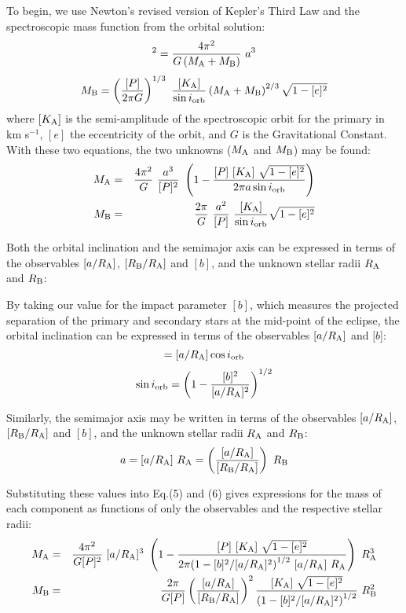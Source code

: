 \documentclass[12pt, preprint]{aastex}
\begin{document}
To begin, we use Newton's revised version of Kepler's Third Law and
the spectroscopic mass function from the orbital solution:
\begin{equation}
[P]^2 = \frac{4 \pi^{2}}{G\left(M_{\rm A} + M_{\rm B}\right)} \ a^{3}
\end{equation}
\begin{equation}
M_{\rm B} = \left(\frac{[P]}{2 \pi G}\right)^{1/3} \ \frac{[K_{\rm A}]}{\sin i_{\rm orb}} 
\left(M_{\rm A} + M_{\rm B}\right)^{2/3} \sqrt{1-[e]^2}
\end{equation}
where $[K_{\rm A}]$ is the semi-amplitude of the spectroscopic
orbit for the primary in km s$^{-1}$, $[e]$ the eccentricity of the
orbit, and $G$ is the Gravitational Constant. With these two equations,
the two unknowns ($M_{\rm A}$ and $M_{\rm B}$) may be found:
\begin{eqnarray}
M_{\rm A} & = & \frac{4 \pi^2}{G} \ \frac{a^3}{[P]^2} \ \left(1 - \frac{[P] \ [K_{\rm A}] \ \sqrt{1-[e]^2} }{ 2 \pi a \sin i_{\rm orb}} \right) \\
M_{\rm B} & = & \frac{2 \pi}{G} \ \frac{a^2}{[P]} \ \frac{[K_{\rm A}]}{\sin i_{\rm orb}} \sqrt{1-[e]^2}
\end{eqnarray}

Both the orbital inclination and the semimajor axis can be expressed in
terms of the observables $[a/R_{\rm A}]$, $[R_{\rm B}/R_{\rm
A}]$ and $[b]$, and the unknown stellar radii $R_{\rm A}$ and $R_{\rm B}$:

By taking our value for the impact parameter $[b]$, which measures the projected separation of the primary and secondary stars at the mid-point of the eclipse, the orbital inclination can be expressed in terms of the observables $[a/R_{\rm A}]$ and $[b$]:
\begin{equation}
[b] = [a/R_{\rm A}] \cos i_{\rm orb}
\end{equation}
\begin{equation}
\sin i_{\rm orb} = \left(1 - \frac{[b]^2}{[a/R_{\rm A}]^2}\right)^{1/2}
\end{equation}

Similarly, the semimajor axis may be written in terms of the observables $[a/R_{\rm A}]$, $[R_{\rm B}/R_{\rm A}]$ and $[b]$, and the unknown stellar radii $R_{\rm A}$ and $R_{\rm B}$:
\begin{equation}
a = [a/R_{\rm A}] \ R_{\rm A} = \left(\frac{[a/R_{\rm A}]}{[R_{\rm B}/R_{\rm A}]} \right) \ R_{\rm B}
\end{equation}

Substituting these values into Eq.(5) and (6) gives expressions for the mass of each component as functions of only the observables and the respective stellar radii:
\begin{eqnarray}
M_{\rm A} & = & \frac{4 \pi^{2}}{G [P]^2} \ [a/R_{\rm A}]^3 \  \left(1 - \frac{[P] \ [K_{\rm A}] \ \sqrt{1-[e]^2}}{2 \pi {\left(1-[b]^2/[a/R_{\rm A}]^2\right)}^{1/2}\ [a/R_{\rm A}]\ R_{\rm A}}\right) \ R_{\rm A}^3 \\
M_{\rm B} & = & \frac{2 \pi}{G [P]} \left(\frac{[a/R_{\rm A}]}{[R_{\rm B}/R_{\rm A}]}\right)^2 \frac{[K_{\rm A}]\ \sqrt{1-[e]^2}}{\left(1-[b]^2/[a/R_{\rm A}]^2\right)^{1/2}}\ R_{\rm B}^2
\end{eqnarray}
\end{document}

